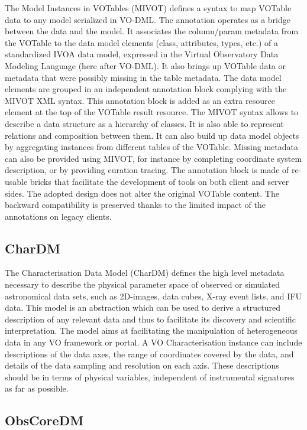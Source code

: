 \documentclass[11pt,letter]{ivoa}
\begin{document}
The Model Instances in VOTables (MIVOT) \citep{2023ivoa.spec.0620M}
defines a syntax to map VOTable data to any model serialized in VO-DML.
The annotation operates as a bridge between the data and the model. It
associates the column/param metadata from the VOTable to the data model
elements (class, attributes, types, etc.) of a standardized IVOA data
model, expressed in the Virtual Observatory Data Modeling Language (here
after VO-DML). It also brings up VOTable data or metadata that were
possibly missing in the table metadata. The data model elements are
grouped in an independent annotation block complying with the MIVOT XML
syntax. This annotation block is added as an extra resource element at
the top of the VOTable result resource. The MIVOT syntax allows to
describe a data structure as a hierarchy of classes. It is also able to
represent relations and composition between them. It can also build up
data model objects by aggregating instances from different tables of the
VOTable. Missing metadata can also be provided using MIVOT, for instance
by completing coordinate system description, or by providing curation
tracing. The annotation block is made of re-usable bricks that
facilitate the development of tools on both client and server sides. The
adopted design does not alter the original VOTable content. The backward
compatibility is preserved thanks to the limited impact of the
annotations on legacy clients.


\subsection{CharDM} 

The Characterisation Data Model (CharDM) \citep{2008ivoa.spec.0325L}
defines the high level metadata necessary to describe the
physical parameter space of observed or simulated astronomical data
sets, such as 2D-images,
data cubes, X-ray event lists, and IFU data. This model is an
abstraction which can be used
to derive a structured description of any relevant data and thus to
facilitate its discovery
and scientific interpretation. The model aims at facilitating the
manipulation of heterogeneous
data in any VO framework or portal. A VO Characterisation instance can
include descriptions of
the data axes, the range of coordinates covered by the data, and details
of the data sampling
and resolution on each axis. These descriptions should be in terms of
physical variables,
independent of instrumental signatures as far as possible.

\subsection{ObsCoreDM}
\end{document}
